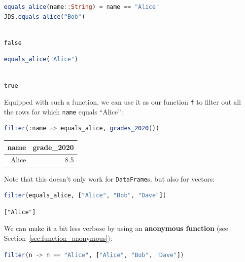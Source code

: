 \documentclass[
  notoc %
]{tufte-book}
\newcommand{\passthrough}[1]{#1}
\begin{document}
\begin{lstlisting}[language=Julia]
equals_alice(name::String) = name == "Alice"
JDS.equals_alice("Bob")
\end{lstlisting}

\begin{lstlisting}[language=Output]

false

\end{lstlisting}

\begin{lstlisting}[language=Julia]
equals_alice("Alice")
\end{lstlisting}

\begin{lstlisting}[language=Output]

true

\end{lstlisting}

Equipped with such a function, we can use it as our function
\passthrough{\lstinline!f!} to filter out all the rows for which
\passthrough{\lstinline!name!} equals ``Alice'':

\begin{lstlisting}[language=Julia]
filter(:name => equals_alice, grades_2020())
\end{lstlisting}

\begin{longtable}[]{@{}rr@{}}
\toprule
name & grade\_2020 \\
\midrule
\endhead
Alice & 8.5 \\
\bottomrule
\end{longtable}

Note that this doesn't only work for
\passthrough{\lstinline!DataFrame!}s, but also for vectors:

\begin{lstlisting}[language=Julia]
filter(equals_alice, ["Alice", "Bob", "Dave"])
\end{lstlisting}

\begin{lstlisting}[language=Output]
["Alice"]
\end{lstlisting}

We can make it a bit less verbose by using an \textbf{anonymous
function} (see Section~\ref{sec:function_anonymous}):

\begin{lstlisting}[language=Julia]
filter(n -> n == "Alice", ["Alice", "Bob", "Dave"])
\end{lstlisting}
\end{document}

